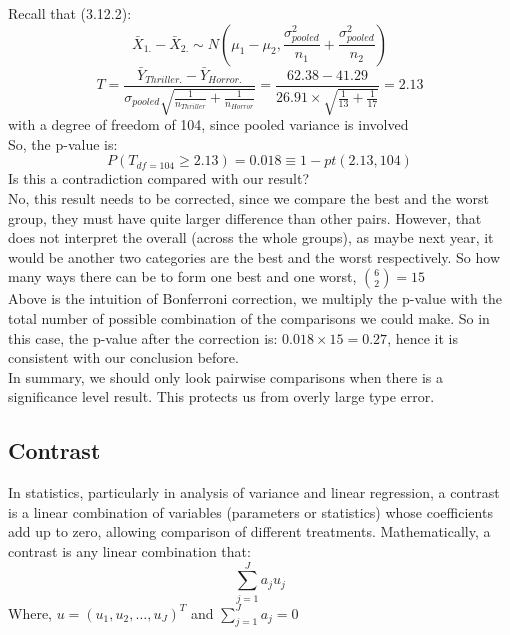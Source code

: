 \documentclass[12pt ]{article}
\newcommand{\RomanNumeralCaps}[1] {\MakeUppercase{\romannumeral #1}}
\begin{document}
Recall that (3.12.2):
\begin{equation*}
\bar{X}_{1.} - \bar{X}_{2.} \sim N(\mu_{1} - \mu_{2}, \frac{\sigma^2_{pooled}}{n_{1}} + \frac{\sigma^2_{pooled}}{n_{2}})
\end{equation*}
\begin{equation*}
T = \frac{\bar{Y}_{Thriller .} - \bar{Y}_{Horror .} }{\sigma_{pooled} \sqrt{\frac{1}{n_{Thriller}} + \frac{1}{n_{Horror}}}} = \frac{62.38 - 41.29}{26.91 \times \sqrt{\frac{1}{13} + \frac{1}{17}}} = 2.13
\end{equation*}
with a degree of freedom of 104, since pooled variance is involved \\
So, the p-value is:
\begin{equation*}
P(T_{df=104}  \geq 2.13) = 0.018 \equiv 1 - pt(2.13, 104)
\end{equation*}
Is this a contradiction compared with our result? \\
No, this result needs to be corrected, since we compare the best and the worst group, they must have quite larger difference than other pairs. However, that does not interpret the overall (across the whole groups), as maybe next year, it would be another two categories are the best and the worst respectively. So how many ways there can be to form one best and one worst, ${6 \choose 2} = 15$ \\

Above is the intuition of Bonferroni correction, we multiply the p-value with the total number of possible combination of the comparisons we could make. So in this case, the p-value after the correction is: $0.018 \times 15 = 0.27$, hence it is consistent with our conclusion before. \\

In summary, we should only look pairwise comparisons when there is a significance level result. This protects us from overly large type \RomanNumeralCaps{1} error.

\subsection{Contrast}
In statistics, particularly in analysis of variance and linear regression, a contrast is a linear combination of variables (parameters or statistics) whose coefficients add up to zero, allowing comparison of different treatments. Mathematically, a contrast is any linear combination that:
\begin{equation*}
\sum^{J}_{j=1} a_{j}u_{j}
\end{equation*}
Where, $u = (u_{1}, u_{2}, \ldots, u_{J})^T$ and $\sum^{J}_{j=1} a_{j} = 0$
\end{document}
